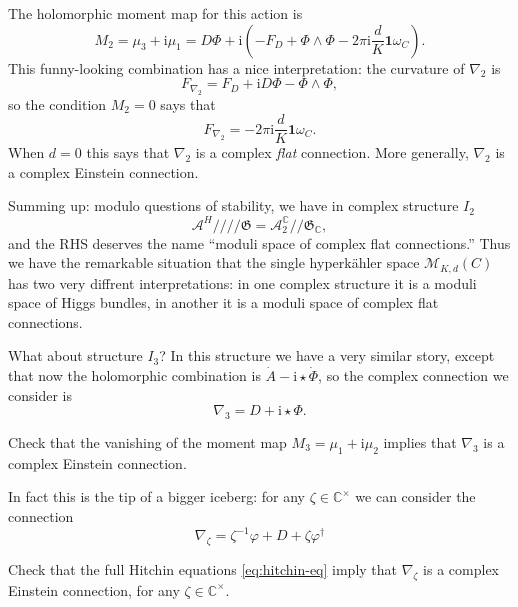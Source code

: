 \documentclass[12pt,letterpaper,reqno]{article}
\numberwithin{equation}{section}
\newcommand{\fG}{{\mathfrak G}}
\newcommand{\cM}{\ensuremath{\mathcal M}}
\newcommand{\cA}{\ensuremath{\mathcal A}}
\newcommand{\C}{\ensuremath{\mathbb C}}
\newcommand{\kq}{/\!\!/}
\newcommand{\hk}{hyperk\"ahler\xspace}
\newcommand{\hkq}{/\!\!/\!\!/\!\!/}
\newcommand{\I}{{\mathrm i}}
\newcommand\bid{{\mathbf 1}}
\newcommand{\ti}[1]{\textit{#1}}
\begin{document}
The holomorphic moment
map for this action is
\begin{equation}
  M_2 = \mu_3 + \I \mu_1 = D \Phi + \I \left(-F_D + \Phi \wedge \Phi - 2 \pi \I \frac{d}{K} \bid \omega_C\right).
\end{equation}
This funny-looking combination has a nice interpretation:
the curvature of $\nabla_2$ is
\begin{equation}
  F_{\nabla_2} = F_D + \I D\Phi - \Phi \wedge \Phi,
\end{equation}
so the condition $M_2 = 0$ says that
\begin{equation}
  F_{\nabla_2} = - 2\pi \I \frac{d}{K} \bid \omega_C.
\end{equation}
When $d=0$ this says that $\nabla_2$ is a complex \ti{flat}
connection. More generally, $\nabla_2$ is a complex Einstein connection.

Summing up: modulo questions of stability, we have in complex 
structure $I_2$
\begin{equation}
  \cA^H \hkq \fG = \cA_2^\C \kq \fG_\C,
\end{equation}
and the RHS deserves the name ``moduli space of complex flat connections.''
Thus we have the remarkable situation that the single \hk space
$\cM_{K,d}(C)$ has two very diffrent interpretations:
in one complex structure it is a moduli space of Higgs bundles,
in another it is a moduli space of complex flat connections.

What about structure $I_3$? In this structure we have a very similar
story, except that now the holomorphic combination is
$\dot A - \I \star \dot \Phi$, so the complex connection we consider is
\begin{equation}
  \nabla_3 = D + \I \star \Phi.
\end{equation}

\begin{exercise}
Check that the vanishing of the moment map $M_3 = \mu_1 + \I \mu_2$
implies that $\nabla_3$ is a complex Einstein connection.
\end{exercise}

In fact this is the tip of a bigger iceberg:
for any $\zeta \in \C^\times$ we can consider the connection
\begin{equation} \label{eq:nabla-zeta}
  \nabla_\zeta = \zeta^{-1} \varphi + D + \zeta \varphi^\dagger
\end{equation}

\begin{exercise}
Check that the full Hitchin equations \eqref{eq:hitchin-eq}
imply that $\nabla_\zeta$ is a complex Einstein connection,
for any $\zeta \in \C^\times$.
\end{exercise}
\end{document}
